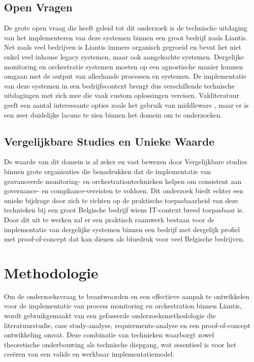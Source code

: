 \subsection{Open Vragen}

De grote open vraag die heeft geleid tot dit onderzoek is de technische uitdaging van het implementeren van deze systemen binnen een groot bedrijf zoals Liantis. Net zoals veel bedrijven is Liantis immers organisch gegroeid en bevat het niet enkel veel inhouse legacy systemen, maar ook aangekochte systemen. Dergelijke monitoring en orchestratie systemen moeten op een agnostische manier kunnen omgaan met de output van allerhande processen en systemen. De implementatie van deze systemen in een bedrijfscontext brengt dus verschillende technische uitdagingen met zich mee die vaak custom oplossingen vereisen. Vakliteratuur geeft een aantal interessante opties zoals het gebruik van middleware \autocite{Weber2018}, maar er is een zeer duidelijke lacune te zien binnen het domein om te onderzoeken. 

\subsection{Vergelijkbare Studies en Unieke Waarde}

De waarde van dit domein is al zeker en vast bewezen door Vergelijkbare studies binnen grote organisaties \autocite{Harmon2014} die benadrukken dat de implementatie van geavanceerde monitoring- en orchestrationtechnieken helpen om consistent aan governance- en compliance-vereisten te voldoen. Dit onderzoek biedt echter een unieke bijdrage door zich te richten op de praktische toepasbaarheid van deze technieken bij een groot Belgische bedrijf wiens IT-context breed toepasbaar is. Door dit uit te werken zal er een praktisch raamwerk bestaan voor de implementatie van dergelijke systemen binnen een bedrijf met dergelijk profiel met proof-of-concept dat kan dienen als bluedruk voor veel Belgische bedrijven. 

\section{Methodologie}%
\label{sec:methodologie}

Om de onderzoeksvraag te beantwoorden en een effectieve aanpak te ontwikkelen voor de implementatie van process monitoring en orchestration binnen Liantis, wordt gebruikgemaakt van een gefaseerde onderzoeksmethodologie die literatuurstudie, case study-analyse, requirements-analyse en een proof-of-concept ontwikkeling omvat. Deze combinatie van technieken waarborgt zowel theoretische onderbouwing als technische diepgang, wat essentieel is voor het creëren van een valide en werkbaar implementatiemodel.

